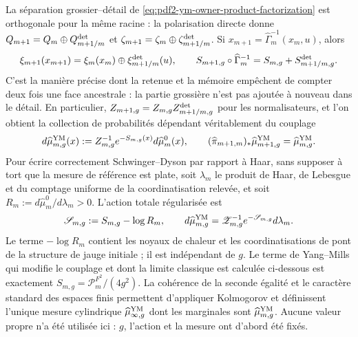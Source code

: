 La séparation grossier--détail de \eqref{eq:pdf2-ym-owner-product-factorization} est orthogonale pour la même racine : la polarisation directe donne $Q_{m+1}=Q_m\oplus Q_{m+1/m}^{\rm det}$ et $\zeta_{m+1}=\zeta_m\oplus\zeta_{m+1/m}^{\rm det}$. Si $x_{m+1}=\widehat\Gamma_m^{-1}(x_m,u)$, alors
\begin{equation}\label{eq:pdf2-ym-action-cocycle}
 \xi_{m+1}(x_{m+1})
 =\xi_m(x_m)\oplus\xi_{m+1/m}^{\rm det}(u),
 \qquad
 S_{m+1,g}\circ\widehat\Gamma_m^{-1}
 =S_{m,g}+S_{m+1/m,g}^{\rm det}.
\end{equation}
C'est la manière précise dont la retenue et la mémoire empêchent de compter deux fois une face ancestrale : la partie grossière n'est pas ajoutée à nouveau dans le détail. En particulier, $Z_{m+1,g}=Z_{m,g}Z_{m+1/m,g}^{\rm det}$ pour les normalisateurs, et l'on obtient la collection de probabilités dépendant véritablement du couplage
\begin{equation}\label{eq:pdf2-ym-gibbs-measure}
 d\widehat\mu_{m,g}^{\rm YM}(x)
 :=Z_{m,g}^{-1}e^{-S_{m,g}(x)}d\widehat\mu_m^0(x),
 \qquad
 (\widehat\pi_{m+1,m})_*\widehat\mu_{m+1,g}^{\rm YM}
 =\widehat\mu_{m,g}^{\rm YM}.
\end{equation}
Pour écrire correctement Schwinger--Dyson par rapport à Haar, sans supposer à tort que la mesure de référence est plate, soit $\lambda_m$ le produit de Haar, de Lebesgue et du comptage uniforme de la coordinatisation relevée, et soit $R_m:=d\widehat\mu_m^0/d\lambda_m>0$. L'action totale régularisée est
\begin{equation}\label{eq:pdf2-ym-total-regulated-action}
 \mathscr S_{m,g}:=S_{m,g}-\log R_m,
 \qquad
 d\widehat\mu_{m,g}^{\rm YM}
 =\mathscr Z_{m,g}^{-1}e^{-\mathscr S_{m,g}}d\lambda_m.
\end{equation}
Le terme $-\log R_m$ contient les noyaux de chaleur et les coordinatisations de pont de la structure de jauge initiale ; il est indépendant de $g$. Le terme de Yang--Mills qui modifie le couplage et dont la limite classique est calculée ci-dessous est exactement $S_{m,g}=\mathcal P_m^{F^2}/(4g^2)$. La cohérence de la seconde égalité et le caractère standard des espaces finis permettent d'appliquer Kolmogorov et définissent l'unique mesure cylindrique $\widehat\mu_{\infty,g}^{\rm YM}$ dont les marginales sont $\widehat\mu_{m,g}^{\rm YM}$. Aucune valeur propre n'a été utilisée ici : $g$, l'action et la mesure ont d'abord été fixés.

